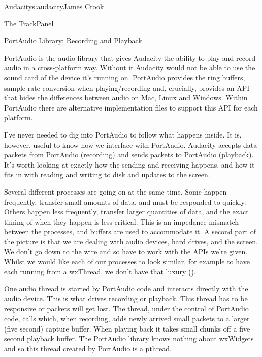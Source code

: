 \begin{aosachapter}{Audacity}{s:audacity}{James Crook}
\begin{aosasect1}{The TrackPanel}
\end{aosasect1}

\begin{aosasect1}{PortAudio Library: Recording and Playback}

PortAudio is the audio library that gives Audacity the ability to play
and record audio in a cross-platform way.  Without it Audacity would
not be able to use the sound card of the device it's running on.
PortAudio provides the ring
buffers, sample rate conversion when playing/recording and, crucially,
provides an API that hides the differences between audio on Mac, Linux
and Windows.  Within PortAudio there are alternative implementation
files to support this API for each platform.

I've never needed to dig into PortAudio to follow what happens inside.
It is, however, useful to know how we interface with PortAudio.
Audacity accepts data packets from PortAudio (recording) and sends
packets to PortAudio (playback).  It's worth looking at
exactly how the sending and
receiving happens, and how it fits in with reading and writing to disk
and updates to the screen.

Several different processes are going on at the same time.  Some
happen frequently, transfer small amounts of data, and must be
responded to quickly.  Others happen less frequently, transfer larger
quantities of data, and the exact timing of when they happen is less
critical.  This is an impedance mismatch between the processes,
and buffers are used to accommodate it.  A second part of the picture is
that we are dealing with audio devices, hard drives,
and the screen.  We don't go down to the wire and so have to work with
the APIs we're given.  Whilst we would like each of our processes to
look similar, for example to have each running from a wxThread, we
don't have that luxury ().


One audio thread is started by PortAudio code and interacts directly
with the audio device.  This is what drives recording or playback.
This thread has to be responsive or packets will get lost.  The
thread, under the control of PortAudio code, calls
 which, when recording, adds newly arrived
small packets to a larger (five second) capture buffer.  When playing
back it takes small chunks off a five second playback buffer.  The
PortAudio library knows nothing about wxWidgets and so this thread
created by PortAudio is a pthread.


\end{aosasect1}
\end{aosachapter}
